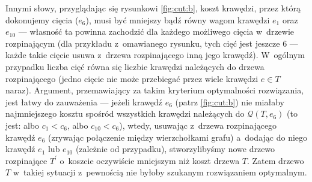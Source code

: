 Innymi słowy, przyglądając się rysunkowi \ref{fig:cut:b}, koszt krawędzi, przez którą dokonujemy cięcia ($e_{6}$), musi być mniejszy bądź równy wagom krawędzi $e_{1}$ oraz $e_{10}$ --- własność ta powinna zachodzić dla każdego możliwego cięcia w~drzewie rozpinającym (dla przykładu z~omawianego rysunku, tych cięć jest jeszcze $6$ --- każde takie cięcie usuwa z~drzewa rozpinającego inną jego krawędź).
W~ogólnym przypadku liczba cięć równa się liczbie krawędzi należących do drzewa rozpinającego (jedno cięcie nie może przebiegać przez wiele krawędzi $e \in T$ naraz).
Argument, przemawiający za takim kryterium optymalności rozwiązania, jest łatwy do zauważenia --- jeżeli krawędź $e_{6}$ (patrz \ref{fig:cut:b}) nie miałaby najmniejszego kosztu spośród wszystkich krawędzi należących do $\mathcal{Q} \left( T, e_{6} \right)$ (to jest: albo $c_{1} < c_{6}$, albo $c_{10} < c_{6}$), wtedy, usuwając z~drzewa rozpinającego krawędź $e_{6}$ (zrywając połączenie między wierzchołkami grafu) a~dodając do niego krawędź $e_{1}$ lub $e_{10}$ (zależnie od przypadku), stworzylibyśmy nowe drzewo rozpinające $T^{\prime}$ o~koszcie oczywiście mniejszym niż koszt drzewa $T$.
Zatem drzewo $T$ w~takiej sytuacji z~pewnością nie byłoby szukanym rozwiązaniem optymalnym.
\\
